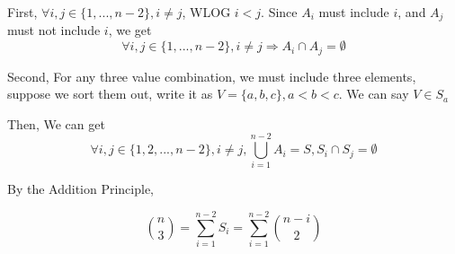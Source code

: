 \documentclass{article}
\def\implies{\Longrightarrow}
\begin{document}
First, $\forall i, j \in \{1, ..., n - 2\}, i \neq j$, WLOG $i < j$. Since $A_i$ must include $i$, and $A_j$ must not include $i$, we get $$\forall i, j \in \{1, ..., n - 2\}, i \neq j \implies A_i \cap A_j = \emptyset$$

Second, For any three value combination, we must include three elements, suppose we sort them out, write it as $V = \{a, b, c\}, a < b < c$. We can say $V \in S_a$

Then, We can get $$\forall i, j \in \{1, 2, ..., n - 2\}, i \neq j, \bigcup \limits_{i = 1}^{n - 2} A_i = S, S_i \cap S_j = \emptyset$$

By the Addition Principle,

$${n \choose 3} = \sum \limits_{i = 1}^{n - 2} S_i = \sum \limits_{i = 1}^{n - 2} {n - i \choose 2}$$
\end{document}
